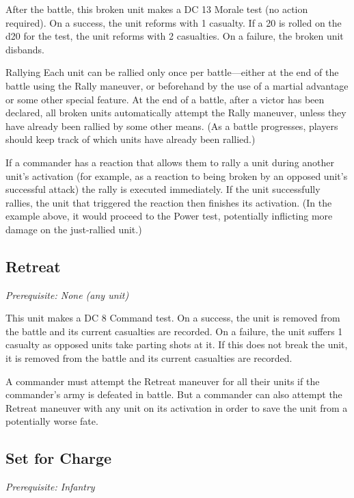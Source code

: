 \documentclass[10pt,a4paper,twoside,bg=print,twocolumn,openany,nodeprecatedcode]{dndbook}
\begin{document}
After the battle, this broken unit makes a DC 13 Morale test (no action required). On a success, the unit reforms with 1 casualty. If a 20 is rolled on the d20 for the test, the unit reforms with 2 casualties. On a failure, the broken unit disbands.

\begin{DndSidebar}[float=!b]{Rallying}
Each unit can be rallied only once per battle—either at the end of the battle using the Rally maneuver, or beforehand by the use of a martial advantage or some other special feature. At the end of a battle, after a victor has been declared, all broken units automatically attempt the Rally maneuver, unless they have already been rallied by some other means. (As a battle progresses, players should keep track of which units have already been rallied.)



If a commander has a reaction that allows them to rally a unit during another unit's activation (for example, as a reaction to being broken by an opposed unit's successful attack) the rally is executed immediately. If the unit successfully rallies, the unit that triggered the reaction then finishes its activation. (In the example above, it would proceed to the Power test, potentially inflicting more damage on the just-rallied unit.)



\end{DndSidebar}

\subsection{Retreat}
\textit{Prerequisite: None (any unit)}

This unit makes a DC 8 Command test. On a success, the unit is removed from the battle and its current casualties are recorded. On a failure, the unit suffers 1 casualty as opposed units take parting shots at it. If this does not break the unit, it is removed from the battle and its current casualties are recorded.

A commander must attempt the Retreat maneuver for all their units if the commander's army is defeated in battle. But a commander can also attempt the Retreat maneuver with any unit on its activation in order to save the unit from a potentially worse fate.

\subsection{Set for Charge}
\textit{Prerequisite: Infantry}
\end{document}
